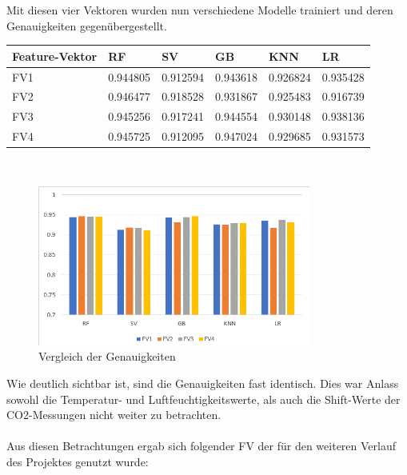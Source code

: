 Mit diesen vier Vektoren wurden nun verschiedene Modelle trainiert und deren Genauigkeiten gegenübergestellt.

\begin{center}
    \begin{tabular}{|p{1.5cm}||p{2cm}| p{2cm}| p{2cm}| p{2cm}| p{2cm}|} 
        \hline
        Feature-Vektor&RF &SV &GB &KNN&LR \\ [0.5ex] 
        \hline\hline
        FV1&0.944805&	0.912594&	0.943618&	0.926824&   0.935428\\
        \hline
        FV2&0.946477&	0.918528&	0.931867&	0.925483&   0.916739\\
        \hline
        FV3&0.945256&	0.917241&	0.944554&	0.930148&   0.938136\\
        \hline
        FV4&0.945725&	0.912095&	0.947024&	0.929685&   0.931573\\
        \hline
    \end{tabular}\\        
\end{center}

\begin{figure}[h]
    \centering
    \includegraphics[width=0.8\textwidth]{pic/FV_comp.png}
    \caption{Vergleich der Genauigkeiten}
    \label{fig:FIB}
\end{figure}

Wie deutlich sichtbar ist, sind die Genauigkeiten fast identisch. Dies war Anlass sowohl die Temperatur- und 
Luftfeuchtigkeitswerte, als auch die Shift-Werte der CO2-Messungen nicht weiter zu betrachten.\\\\
\newpage
Aus diesen Betrachtungen ergab sich folgender FV der für den weiteren Verlauf des Projektes genutzt wurde:\\

